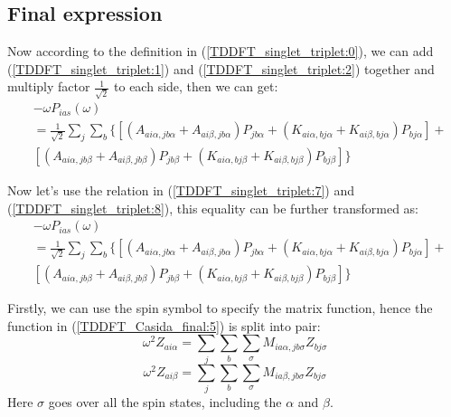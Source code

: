 \subsection{Final expression}
%
%
%
%
Now according to the definition in (\ref{TDDFT_singlet_triplet:0}),
we can add (\ref{TDDFT_singlet_triplet:1}) and
(\ref{TDDFT_singlet_triplet:2}) together and multiply factor
$\frac{1}{\sqrt{2}}$ to each side, then we can get:
\begin{equation}
 \begin{split}
&-\omega  P_{ias} (\omega) \\
&=
\frac{1}{\sqrt{2}}\sum_{j}\sum_{b}\Big\{ \left[ 
\left( A_{ai\alpha, jb\alpha} + A_{ai\beta,
jb\alpha}\right)P_{jb\alpha} + 
\left( K_{ai\alpha, bj\alpha} +
K_{ai\beta, bj\alpha}\right)P_{bj\alpha} \right] + \\
&\left[ \left( A_{ai\alpha, jb\beta} + A_{ai\beta,
jb\beta}\right)P_{jb\beta}  +
\left( K_{ai\alpha, bj\beta} +
K_{ai\beta, bj\beta}\right)P_{bj\beta} \right] \Big\} 
 \end{split}
\label{TDDFT_singlet_triplet:9}
\end{equation} 

Now let's use the relation in (\ref{TDDFT_singlet_triplet:7}) and
(\ref{TDDFT_singlet_triplet:8}), this equality can be further
transformed as:
\begin{equation}
 \begin{split}
&-\omega  P_{ias} (\omega) \\
&=
\frac{1}{\sqrt{2}}\sum_{j}\sum_{b}\Big\{ \left[ 
\left( A_{ai\alpha, jb\alpha} + A_{ai\beta,
jb\alpha}\right)P_{jb\alpha} + 
\left( K_{ai\alpha, bj\alpha} +
K_{ai\beta, bj\alpha}\right)P_{bj\alpha} \right] + \\
&\left[ \left( A_{ai\alpha, jb\beta} + A_{ai\beta,
jb\beta}\right)P_{jb\beta}  +
\left( K_{ai\alpha, bj\beta} +
K_{ai\beta, bj\beta}\right)P_{bj\beta} \right] \Big\} 
 \end{split}
\label{TDDFT_singlet_triplet:10}
\end{equation} 


Firstly, we can use the spin symbol to specify the matrix function,
hence the function in (\ref{TDDFT_Casida_final:5}) is split into pair:
\begin{equation}\label{TDDFT_Casida_final:6}
\omega^{2} Z_{ai\alpha} 
= \sum_{j}\sum_{b}\sum_{\sigma}M_{ia\alpha, jb\sigma} Z_{bj\sigma}
\end{equation}
\begin{equation}\label{TDDFT_Casida_final:7}
\omega^{2} Z_{ai\beta} 
= \sum_{j}\sum_{b}\sum_{\sigma}M_{ia\beta, jb\sigma} Z_{bj\sigma}
\end{equation}
Here $\sigma$ goes over all the spin states, including the $\alpha$ and
$\beta$. 

